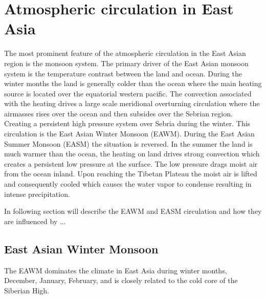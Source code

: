\section{Atmospheric circulation in East Asia}
The most prominent feature of the atmospheric circulation in the East Asian region is the monsoon system. The primary driver of the East Asian monsoon system is the temperature contrast between the land and ocean. During the winter months the land is generally colder than the ocean where the main heating source is located over the equatorial western pacific. The convection associated with the heating drives a large scale meridional overturning circulation where the airmasses rises over the ocean and then subsides over the Sebrian region. Creating a persistent high pressure system over Sebria during the winter. This circulation is the East Asian Winter Monsoon (EAWM). During the East Asian Summer Monsoon (EASM) the situation is reversed. In the summer the land is much warmer than the ocean, the heating on land drives strong convection which creates a persistent low pressure at the surface. The low pressure drags moist air from the ocean inland. Upon reaching the Tibetan Plateau the moist air is lifted and consequently cooled which causes the water vapor to condense resulting in intense precipitation. 

In following section will describe the EAWM and EASM circulation and how they are influenced by ...   

\subsection{East Asian Winter Monsoon}
The EAWM dominates the climate in East Asia during winter months, December, January, February, and is closely related to the cold core of the Siberian High.  

